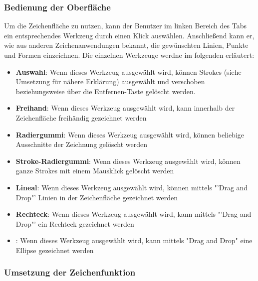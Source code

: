 \subsubsection{Bedienung der Oberfläche}

Um die Zeichenfläche zu nutzen, kann der Benutzer im linken Bereich des Tabs ein entsprechendes Werkzeug durch einen Klick auswählen. Anschließend kann er, wie aus anderen Zeichenanwendungen bekannt, die gewünschten Linien, Punkte und Formen einzeichnen. Die einzelnen Werkzeuge werdne im folgenden erläutert:
\begin{itemize}
\item \textbf{Auswahl}: Wenn dieses Werkzeug ausgewählt wird, können Strokes (siehe Umsetzung für nähere Erklärung) ausgewählt und verschoben beziehungsweise über die Entfernen-Taste gelöscht werden.
\item \textbf{Freihand}: Wenn dieses Werkzeug ausgewählt wird, kann innerhalb der Zeichenfläche freihändig gezeichnet werden
\item \textbf{Radiergummi}: Wenn dieses Werkzeug ausgewählt wird, können beliebige Ausschnitte der Zeichnung gelöscht werden
\item \textbf{Stroke-Radiergummi}: Wenn dieses Werkzeug ausgewählt wird, können ganze Strokes mit einem Mausklick gelöscht werden
\item \textbf{Lineal}: Wenn dieses Werkzeug ausgewählt wird, können mittels "'Drag and Drop"' Linien in der Zeichenfläche gezeichnet werden
\item \textbf{Rechteck}: Wenn dieses Werkzeug ausgewählt wird, kann mittels "'Drag and Drop"' ein Rechteck gezeichnet werden
\item {}: Wenn dieses Werkzeug ausgewählt wird, kann mittels "Drag and Drop" eine Ellipse gezeichnet werden
\end{itemize}

\subsubsection{Umsetzung der Zeichenfunktion}

